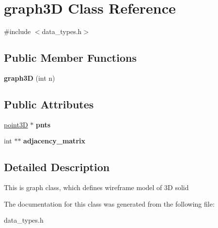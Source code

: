\hypertarget{classgraph3_d}{}\section{graph3D Class Reference}
\label{classgraph3_d}


{\ttfamily \#include $<$data\+\_\+types.\+h$>$}

\subsection*{Public Member Functions}
\begin{DoxyCompactItemize}
\item 
\mbox{\label{classgraph3_d_ad7845e3cd7496fd065460537cd666036}} 
{\bfseries graph3D} (int n)
\end{DoxyCompactItemize}
\subsection*{Public Attributes}
\begin{DoxyCompactItemize}
\item 
\mbox{\label{classgraph3_d_ad327df417f514f3c10d029010a2a17e2}} 
\mbox{\hyperlink{classpoint3_d}{point3D}} $\ast$ {\bfseries pnts}
\item 
\mbox{\label{classgraph3_d_a296f528bb66273988c3b22e67bc80dbb}} 
int $\ast$$\ast$ {\bfseries adjacency\+\_\+matrix}
\end{DoxyCompactItemize}


\subsection{Detailed Description}
This is graph class, which defines wireframe model of 3D solid 

The documentation for this class was generated from the following file\+:\begin{DoxyCompactItemize}
\item 
data\+\_\+types.\+h\end{DoxyCompactItemize}
